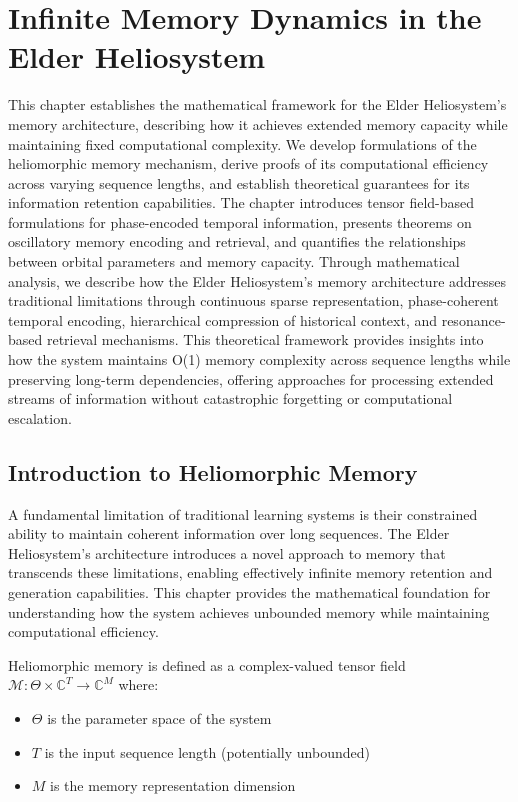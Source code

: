 \chapter{Infinite Memory Dynamics in the Elder Heliosystem}

\begin{tcolorbox}[colback=PureBlue!5!white,colframe=PureBlue!75!black,title=Chapter Summary]
This chapter establishes the mathematical framework for the Elder Heliosystem's memory architecture, describing how it achieves extended memory capacity while maintaining fixed computational complexity. We develop formulations of the heliomorphic memory mechanism, derive proofs of its computational efficiency across varying sequence lengths, and establish theoretical guarantees for its information retention capabilities. The chapter introduces tensor field-based formulations for phase-encoded temporal information, presents theorems on oscillatory memory encoding and retrieval, and quantifies the relationships between orbital parameters and memory capacity. Through mathematical analysis, we describe how the Elder Heliosystem's memory architecture addresses traditional limitations through continuous sparse representation, phase-coherent temporal encoding, hierarchical compression of historical context, and resonance-based retrieval mechanisms. This theoretical framework provides insights into how the system maintains O(1) memory complexity across sequence lengths while preserving long-term dependencies, offering approaches for processing extended streams of information without catastrophic forgetting or computational escalation.
\end{tcolorbox}

\section{Introduction to Heliomorphic Memory}

A fundamental limitation of traditional learning systems is their constrained ability to maintain coherent information over long sequences. The Elder Heliosystem's architecture introduces a novel approach to memory that transcends these limitations, enabling effectively infinite memory retention and generation capabilities. This chapter provides the mathematical foundation for understanding how the system achieves unbounded memory while maintaining computational efficiency.

\begin{definition}
Heliomorphic memory is defined as a complex-valued tensor field $\mathcal{M}: \Theta \times \mathbb{C}^T \rightarrow \mathbb{C}^M$ where:
\begin{itemize}
    \item $\Theta$ is the parameter space of the system
    \item $T$ is the input sequence length (potentially unbounded)
    \item $M$ is the memory representation dimension
\end{itemize}
\end{definition}

